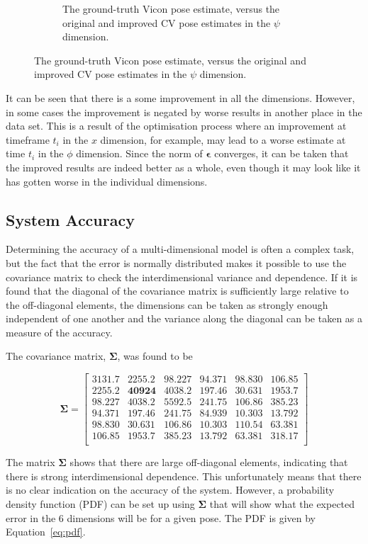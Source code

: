 \begin{figure}
\begin{subfigure}{0.45\textwidth}
    \caption{The ground-truth Vicon pose estimate, versus the original and improved CV pose estimates in the $\psi$ dimension.}
  \label{fig:estimate-yaw}
  \end{subfigure}
\end{figure}

It can be seen that there is a some improvement in all the dimensions. However, in some cases the improvement is negated by worse results in another place in the data set. This is a result of the optimisation process where an improvement at timeframe $t_i$ in the $x$ dimension, for example, may lead to a worse estimate at time $t_i$ in the $\phi$ dimension. Since the norm of $\bm{\epsilon}$ converges, it can be taken that the improved results are indeed better as a whole, even though it may look like it has gotten worse in the individual dimensions.

\subsection{System Accuracy}

Determining the accuracy of a multi-dimensional model is often a complex task, but the fact that the error is normally distributed makes it possible to use the covariance matrix to check the interdimensional variance and dependence. If it is found that the diagonal of the covariance matrix is sufficiently large relative to the off-diagonal elements, the dimensions can be taken as strongly enough independent of one another and the variance along the diagonal can be taken as a measure of the accuracy. 

The covariance matrix, $\bm{\Sigma}$, was found to be 

\[
  \bm{\Sigma} = 
  \begin{bmatrix}
    \bm{3131.7} & 2255.2 & 98.227 & 94.371 &  98.830 & 106.85 \\ 
    2255.2 & \bm{40924}  & 4038.2 & 197.46 &  30.631 & 1953.7 \\
    98.227 & 4038.2 & \bm{5592.5} & 241.75 &  106.86 & 385.23 \\
    94.371 & 197.46 & 241.75 & \bm{84.939} &  10.303 & 13.792 \\
    98.830 & 30.631 & 106.86 & 10.303 &  \bm{110.54} & 63.381 \\
    106.85 & 1953.7 & 385.23 & 13.792 &  63.381 & \bm{318.17} \\
  \end{bmatrix}
\]

The matrix $\bm{\Sigma}$ shows that there are large off-diagonal elements, indicating that there is strong interdimensional dependence. This unfortunately means that there is no clear indication on the accuracy of the system. However, a probability density function (PDF) can be set up using $\bm{\Sigma}$ that will show what the expected error in the 6 dimensions will be for a given pose. The PDF is given by Equation~\ref{eq:pdf}.


